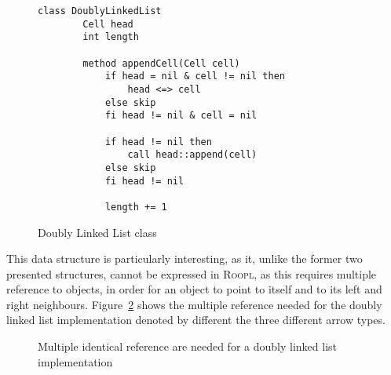 \begin{figure}[ht!]
    \centering
    \begin{lstlisting}[style = basic, language = roopl] 
    class DoublyLinkedList
        Cell head
        int length
    
        method appendCell(Cell cell)
            if head = nil & cell != nil then
                head <=> cell
            else skip
            fi head != nil & cell = nil
    
            if head != nil then 
                call head::append(cell)
            else skip
            fi head != nil
    
            length += 1
    \end{lstlisting}
    \caption{Doubly Linked List class}
    \label{fig:doubly-linked-list-class}
\end{figure}

This data structure is particularly interesting, as it, unlike the former two presented structures, cannot be expressed in \textsc{Roopl}, as this requires multiple reference to objects, in order for an object to point to itself and to its left and right neighbours. Figure~\ref{fig:doubly-linked-list-reference} shows the multiple reference needed for the doubly linked list implementation denoted by different the three different arrow types.

\begin{figure}[ht]
    \centering
    \caption{Multiple identical reference are needed for a doubly linked list implementation}
    \label{fig:doubly-linked-list-reference}
\end{figure}

